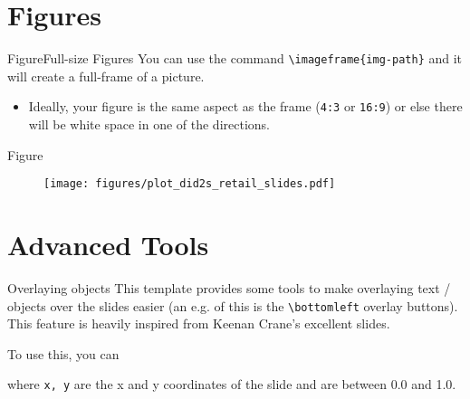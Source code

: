 \documentclass[aspectratio=169,t,11pt,table]{beamer}
\begin{document}
\section{Figures}

\begin{frame}{Figure}{Full-size Figures}
  You can use the command \texttt{\textbackslash imageframe\{img-path\}} and it will create a full-frame of a picture. 
  
  \begin{itemize}
  \item Ideally, your figure is the same aspect as the frame (\texttt{4:3} or \texttt{16:9}) or else there will be white space in one of the directions.
  \end{itemize}
\end{frame}


\begin{frame}{Figure}
  \begin{figure}
    \begin{adjustbox}{width = 0.75\textwidth, center}
      \texttt{[image: figures/plot\_did2s\_retail\_slides.pdf]}
    \end{adjustbox}
  
    \vspace*{-\medskipamount}
  \end{figure}
\end{frame}

\section{Advanced Tools}

\begin{frame}[fragile]{Overlaying objects}
  This template provides some tools to make overlaying text / objects over the slides easier (an e.g. of this is the \texttt{\textbackslash bottomleft} overlay buttons). This feature is heavily inspired from Keenan Crane's excellent slides.

  \bigskip
  To use this, you can 
  \begin{codeblock}[tex]
  \end{codeblock}
  where \texttt{x, y} are the x and y coordinates of the slide and are between 0.0 and 1.0.


\end{frame}
\end{document}
